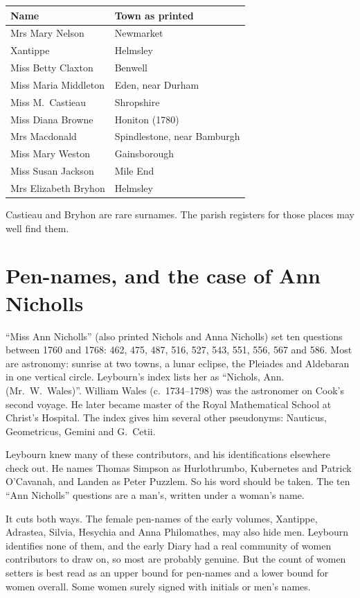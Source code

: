 \documentclass[11pt,a4paper]{article}
\begin{document}
\begin{center}
\begin{tabular}{l l}
\toprule
Name & Town as printed\\
\midrule
Mrs Mary Nelson & Newmarket\\
Xantippe & Helmsley\\
Miss Betty Claxton & Benwell\\
Miss Maria Middleton & Eden, near Durham\\
Miss M.~Castieau & Shropshire\\
Miss Diana Browne & Honiton (1780)\\
Mrs Macdonald & Spindlestone, near Bamburgh\\
Miss Mary Weston & Gainsborough\\
Miss Susan Jackson & Mile End\\
Mrs Elizabeth Bryhon & Helmsley\\
\bottomrule
\end{tabular}
\end{center}

Castieau and Bryhon are rare surnames. The parish registers for those places may well
find them.

\section*{Pen-names, and the case of Ann Nicholls}

``Miss Ann Nicholls'' (also printed Nichols and Anna Nicholls) set ten questions between
1760 and 1768: 462, 475, 487, 516, 527, 543, 551, 556, 567 and 586. Most are astronomy:
sunrise at two towns, a lunar eclipse, the Pleiades and Aldebaran in one vertical
circle. Leybourn's index lists her as ``Nichols, Ann. (Mr.\ W.~Wales)''. William Wales
(c.\ 1734--1798) was the astronomer on Cook's second voyage. He later became master of
the Royal Mathematical School at Christ's Hospital. The index gives him several other
pseudonyms: Nauticus, Geometricus, Gemini and G.~Cetii.

Leybourn knew many of these contributors, and his identifications elsewhere check out.
He names Thomas Simpson as Hurlothrumbo, Kubernetes and Patrick O'Cavanah, and Landen as
Peter Puzzlem. So his word should be taken. The ten ``Ann Nicholls'' questions are a
man's, written under a woman's name.

It cuts both ways. The female pen-names of the early volumes, Xantippe, Adrastea,
Silvia, Hesychia and Anna Philomathes, may also hide men. Leybourn identifies none of
them, and the early Diary had a real community of women contributors to draw on, so
most are probably genuine. But the count of women setters is best read as an upper
bound for pen-names and a lower bound for women overall. Some women surely signed with
initials or men's names.
\end{document}
